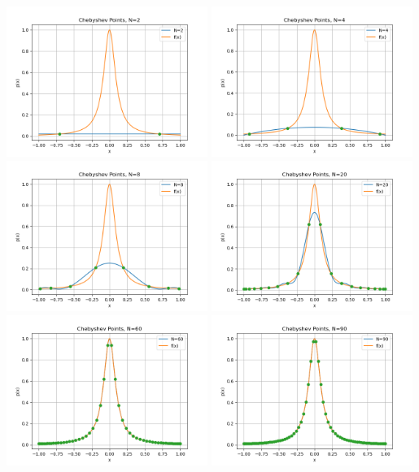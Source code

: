 \documentclass[10pt]{article}
\begin{document}
\begin{enumerate}
  \includegraphics[width=0.49\textwidth]{cheb2.png}
  \includegraphics[width=0.49\textwidth]{cheb4.png}
  \includegraphics[width=0.49\textwidth]{cheb8.png}
  \includegraphics[width=0.49\textwidth]{cheb20.png}
  \includegraphics[width=0.49\textwidth]{cheb60.png}
  \includegraphics[width=0.49\textwidth]{cheb90.png}

  {\small }

\end{enumerate}
\end{document}
